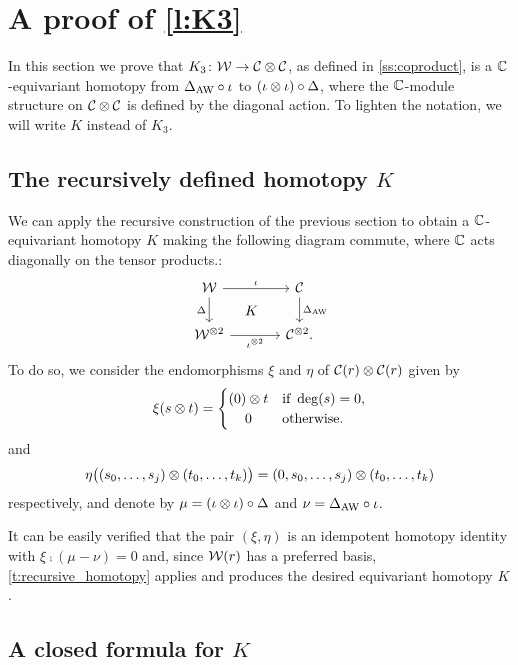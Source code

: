 
\section{A proof of \cref{l:K3}}\label{s:postponed}

\noindent In this section we prove that $K_3 \colon \mathcal{W} \to \mathcal{C} \otimes \mathcal{C}$, as defined in \cref{ss:coproduct}, is a $\mathbb{C}$-equivariant homotopy from $\Delta_{\operatorname{AW}} \mathbin{\circ} \iota$ to $(\iota \otimes \iota) \mathbin{\circ} \Delta$, where the $\mathbb{C}$-module structure on $\mathcal{C} \otimes \mathcal{C}$ is defined by the diagonal action. To lighten the notation, we will write $K$ instead of $K_3$.

\subsection{The recursively defined homotopy $K$}

We can apply the recursive construction of the previous section to obtain a $\mathbb{C}$-equivariant homotopy $K$ making the following diagram commute, where $\mathbb{C}$ acts diagonally on the tensor products.:
\begin{equation*}
	\begin{tikzcd}[column sep=large]
		\cW \arrow[r,"\iota"] \arrow[d,"\Delta"'] \arrow[dr,phantom,"K"]&
		\cC \arrow[d,"\Delta_{\AW}"] \\
		\cW^{\ot 2} \arrow[r,"\iota^{\ot 2}"'] &
		\cC^{\ot 2}.
	\end{tikzcd}
\end{equation*}
To do so, we consider the endomorphisms $\xi$ and $\eta$ of $\mathcal{C}(r) \otimes \mathcal{C}(r)$ given by
\[
\xi(s \ot t) =
\begin{cases}
	(0) \ot t & \text{if } \deg(s) = 0, \\
	\hfil0 & \text{otherwise}.
\end{cases}
\]
and
\[
\eta \big((s_0,\dots,s_j) \otimes (t_0,\dots,t_k)\big) = (0,s_0,\dots,s_j) \otimes (t_0,\dots,t_k)
\]
respectively, and denote by $\mu = (\iota \otimes \iota) \mathbin{\circ} \Delta$ and $\nu = \Delta_{\operatorname{AW}} \mathbin{\circ} \iota$.

It can be easily verified that the pair $(\xi,\eta)$ is an idempotent homotopy identity with $\xi \comp (\mu - \nu) = 0$ and, since $\mathcal{W}(r)$ has a preferred basis, \cref{t:recursive_homotopy} applies and produces the desired equivariant homotopy $K$.

\subsection{A closed formula for $K$}\label{ss:closed formula for K}

